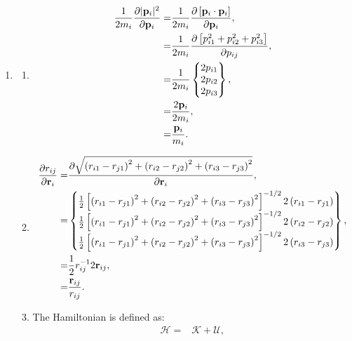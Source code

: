 \documentclass{article}
\begin{document}
\begin{enumerate}[label=\alph*)]
  \item \begin{enumerate}[label=\roman*]
      \item \begin{align*}
          \frac{1}{2m_i} \frac{\partial |\mathbf{p}_i|^2}{\partial \mathbf{p}_i} = & \frac{1}{2m_i} \frac{\partial \left[\mathbf{p}_i \cdot \mathbf{p}_i\right]}{\partial \mathbf{p}_i}, \\
          = & \frac{1}{2m_i} \frac{\partial \left[p_{i1}^2 + p_{i2}^2 + p_{i3}^2\right]}{\partial p_{ij}}, \\
        = & \frac{1}{2m_i} \begin{Bmatrix}2p_{i1} \\ 2p_{i2} \\ 2p_{i3}\end{Bmatrix}, \\
        = & \frac{2 \mathbf{p}_i}{2m_i}, \\
        = & \frac{\mathbf{p}_i}{m_i}.
        \end{align*}
      \item \begin{align*}
          \frac{\partial r_{ij}}{\partial \mathbf{r}_i} = & \frac{\partial \sqrt{\left(r_{i1} - r_{j1}\right)^2 + \left(r_{i2} - r_{j2}\right)^2 + \left(r_{i3} - r_{j3}\right)^2}}{\partial \mathbf{r}_i}, \\
        = & \begin{Bmatrix} \frac{1}{2} \left[\left(r_{i1} - r_{j1}\right)^2 + \left(r_{i2} - r_{j2}\right)^2 + \left(r_{i3} - r_{j3}\right)^2\right]^{-1/2} 2\left(r_{i1} - r_{j1}\right) \\ \frac{1}{2} \left[\left(r_{i1} - r_{j1}\right)^2 + \left(r_{i2} - r_{j2}\right)^2 + \left(r_{i3} - r_{j3}\right)^2\right]^{-1/2} 2\left(r_{i2} - r_{j2}\right) \\ \frac{1}{2} \left[\left(r_{i1} - r_{j1}\right)^2 + \left(r_{i2} - r_{j2}\right)^2 + \left(r_{i3} - r_{j3}\right)^2\right]^{-1/2} 2\left(r_{i3} - r_{j3}\right) \end{Bmatrix}, \\
          = & \frac{1}{2} r_{ij}^{-1} 2\mathbf{r}_{ij}, \\
          = & \frac{\mathbf{r}_{ij}}{r_{ij}}.
        \end{align*}
      \item
        The Hamiltonian is defined as:
        \begin{align}
          \mathcal{H} = & \mathcal{K} + \mathcal{U}, \\ \label{eq:ham2}

\end{align}
\end{enumerate}
\end{enumerate}
\end{document}
